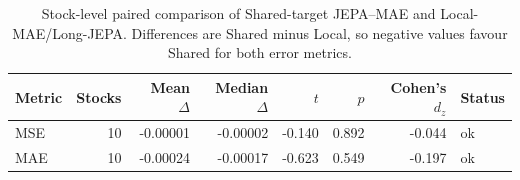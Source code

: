 \begin{table}[t]
\centering
\small
\caption{Stock-level paired comparison of Shared-target JEPA--MAE and Local-MAE/Long-JEPA. Differences are Shared minus Local, so negative values favour Shared for both error metrics.}
\label{tab:shared_vs_local}
\begin{tabular}{lrrrrrrl}
\toprule
Metric & Stocks & Mean $\Delta$ & Median $\Delta$ & $t$ & $p$ & Cohen's $d_z$ & Status \\
\midrule
MSE & 10 & -0.00001 & -0.00002 & -0.140 & 0.892 & -0.044 & ok \\
MAE & 10 & -0.00024 & -0.00017 & -0.623 & 0.549 & -0.197 & ok \\
\bottomrule
\end{tabular}
\end{table}
